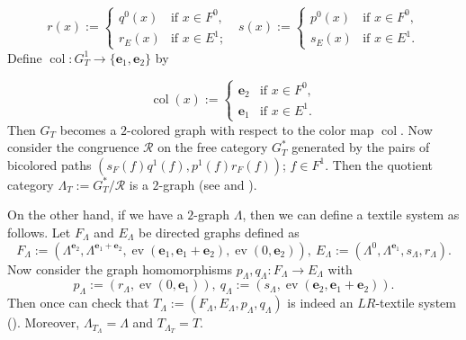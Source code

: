 \documentclass[a4paper,reqno,12pt]{amsart}
\newcommand{\col}{\operatorname{col}}
\newcommand{\ea}{\mathbf{e}_1}
\newcommand{\eb}{\mathbf{e}_2}
\theoremstyle{definition}
\theoremstyle{remark}
\newcommand{\ev}{\operatorname{ev}}
\begin{document}
\[r(x):=
	\left\{
	\begin{array}{ll}
		q^0(x) & \mbox{if }  x\in F^0,\\
        r_E(x) & \mbox{if }  x\in E^1;
	\end{array}
	\right.~~~
s(x):=
	\left\{
	\begin{array}{ll}
		p^0(x) & \mbox{if }  x\in F^0,\\
        s_E(x) & \mbox{if }  x\in E^1.
	\end{array}
	\right. 
\]
Define $\col:G_T^1\longrightarrow \{\ea,\eb\}$ by 

\[\col(x):=
	\left\{
	\begin{array}{ll}
		\eb & \mbox{if }  x\in F^0,\\
        \ea & \mbox{if }  x\in E^1.
	\end{array}
	\right. 
\] 
Then $G_T$ becomes a $2$-colored graph with respect to the color map $\col$. Now consider the congruence $\mathcal{R}$ on the free category $G_T^*$ generated by the pairs of bicolored paths $(s_F(f)q^1(f),p^1(f)r_F(f))$; $f\in F^1$. Then the quotient category $\Lambda_T:=G_T^*/\mathcal{R}$ is a $2$-graph (see \cite[Theorem 3.8]{Tang} and \cite[Theorem 4.6]{BGGLPP}). 

On the other hand, if we have a $2$-graph $\Lambda$, then we can define a textile system as follows. Let $F_\Lambda$ and $E_\Lambda$ be directed graphs defined as \[F_\Lambda:=(\Lambda^{\eb},\Lambda^{\ea+\eb},\ev(\ea,\ea+\eb),\ev(0,\eb)),~E_\Lambda:=(\Lambda^0,\Lambda^{\ea},s_\Lambda,r_\Lambda).\] Now consider the graph homomorphisms $p_\Lambda,q_\Lambda:F_\Lambda\longrightarrow E_\Lambda$ with \[p_\Lambda:=(r_\Lambda,\ev(0,\ea)),~q_\Lambda:=(s_\Lambda,\ev(\eb,\ea+\eb)).\] Then once can check that $T_\Lambda:=(F_\Lambda,E_\Lambda,p_\Lambda,q_\Lambda)$ is indeed an $LR$-textile system (\cite[Definition 3.5 \& Lemma 3.6]{Tang}). Moreover, $\Lambda_{T_\Lambda}=\Lambda$ and $T_{\Lambda_T}=T$. 

\end{document}
